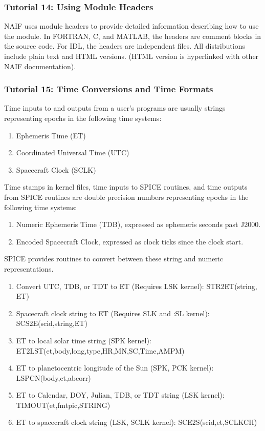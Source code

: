 \documentclass[crop=false,class=article,oneside]{standalone}
\begin{document}
            \subsubsection{Tutorial 14: Using Module Headers}
            NAIF uses module headers to provide detailed information describing how to use the module. In FORTRAN, C, and MATLAB, the headers are comment blocks in the source code. For IDL, the headers are independent files. All distributions include plain text and HTML versions. (HTML version is hyperlinked with other NAIF documentation). 
            \subsubsection{Tutorial 15: Time Conversions and Time Formats}
            Time inputs to and outputs from a user's programs are usually strings representing epochs in the following time systems:
            \begin{enumerate}
                \item Ephemeris Time (ET)
                \item Coordinated Universal Time (UTC)
                \item Spacecraft Clock (SCLK)
            \end{enumerate}
            Time stamps in kernel files, time inputs to SPICE routines, and time outputs from SPICE routines are double precision numbers representing epochs in the following time systems:
            \begin{enumerate}
                \item Numeric Ephemeris Time (TDB), expressed as ephemeris seconds past J2000.
                \item Encoded Spacecraft Clock, expressed as clock ticks since the clock start.
            \end{enumerate}
            SPICE provides routines to convert between these string and numeric representations.
            \begin{enumerate}
                \item Convert UTC, TDB, or TDT to ET (Requires LSK kernel): STR2ET(string, ET)
                \item Spacecraft clock string to ET (Requires SLK and :SL kernel): SCS2E(scid,string,ET)
                \item ET to local solar time string (SPK kernel): ET2LST(et,body,long,type,HR,MN,SC,Time,AMPM)
                \item ET to planetocentric longitude of the Sun (SPK, PCK kernel): LSPCN(body,et,abcorr)
                \item ET to Calendar, DOY, Julian, TDB, or TDT string (LSK kernel): TIMOUT(et,fmtpic,STRING)
                \item ET to spacecraft clock string (LSK, SCLK kernel): SCE2S(scid,et,SCLKCH)
            \end{enumerate}
\end{document}
